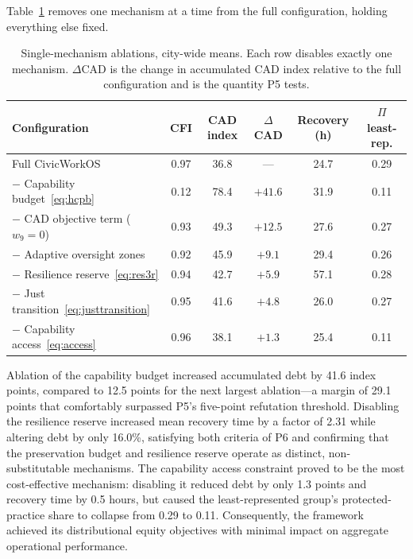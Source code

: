 	Table~\ref{tab:ablation} removes one mechanism at a time from the full configuration, holding everything else fixed.
	
	\begin{table}[!htbp]
		\caption{Single-mechanism ablations, city-wide means. Each row disables exactly one mechanism. $\Delta$CAD is the change in accumulated CAD index relative to the full configuration and is the quantity P5 tests.}
		\label{tab:ablation}
		\small
		\begin{tabularx}{\textwidth}{@{}Xccccc@{}}
			\toprule
			\textbf{Configuration} & \textbf{CFI} & \textbf{CAD index} & \textbf{$\Delta$CAD} & \textbf{Recovery (h)} & \textbf{$\Pi$ least-rep.}\\
			\midrule
			Full CivicWorkOS & 0.97 & 36.8 & --- & 24.7 & 0.29\\
			$-$ Capability budget~\eqref{eq:hcpb} & 0.12 & 78.4 & $+41.6$ & 31.9 & 0.11\\
			$-$ CAD objective term ($w_9{=}0$) & 0.93 & 49.3 & $+12.5$ & 27.6 & 0.27\\
			$-$ Adaptive oversight zones & 0.92 & 45.9 & $+9.1$ & 29.4 & 0.26\\
			$-$ Resilience reserve~\eqref{eq:res3r} & 0.94 & 42.7 & $+5.9$ & 57.1 & 0.28\\
			$-$ Just transition~\eqref{eq:justtransition} & 0.95 & 41.6 & $+4.8$ & 26.0 & 0.27\\
			$-$ Capability access~\eqref{eq:access} & 0.96 & 38.1 & $+1.3$ & 25.4 & 0.11\\
			\bottomrule
		\end{tabularx}
	\end{table}
	
	Ablation of the capability budget increased accumulated debt by 41.6 index points, compared to 12.5 points for the next largest ablation---a margin of 29.1 points that comfortably surpassed P5's five-point refutation threshold. Disabling the resilience reserve increased mean recovery time by a factor of 2.31 while altering debt by only 16.0\%, satisfying both criteria of P6 and confirming that the preservation budget and resilience reserve operate as distinct, non-substitutable mechanisms. The capability access constraint proved to be the most cost-effective mechanism: disabling it reduced debt by only 1.3 points and recovery time by 0.5 hours, but caused the least-represented group's protected-practice share to collapse from 0.29 to 0.11. Consequently, the framework achieved its distributional equity objectives with minimal impact on aggregate operational performance.
	
